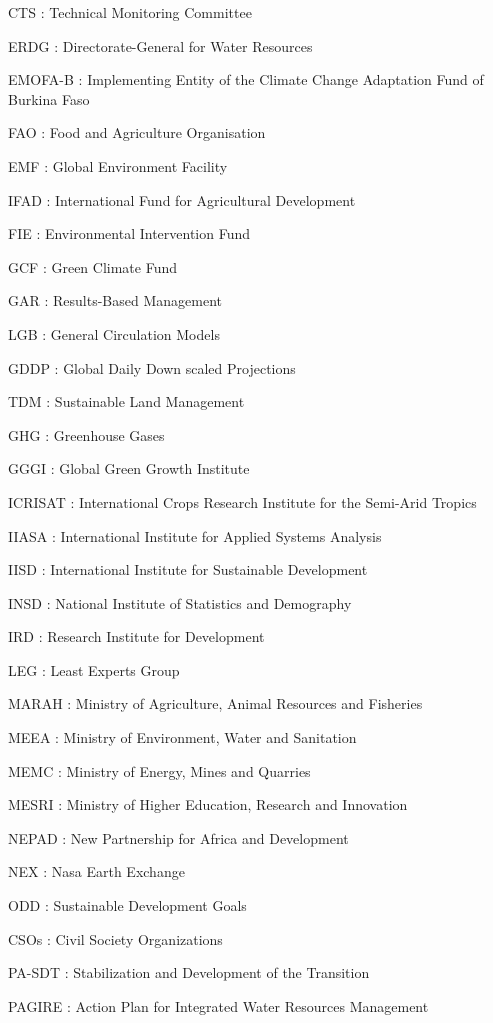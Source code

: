 \documentclass[
]{book}
\begin{document}
CTS : Technical Monitoring Committee

ERDG : Directorate-General for Water Resources

EMOFA-B : Implementing Entity of the Climate Change Adaptation Fund of Burkina Faso

FAO : Food and Agriculture Organisation

EMF : Global Environment Facility

IFAD : International Fund for Agricultural Development

FIE : Environmental Intervention Fund

GCF : Green Climate Fund

GAR : Results-Based Management

LGB : General Circulation Models

GDDP : Global Daily Down scaled Projections

TDM : Sustainable Land Management

GHG : Greenhouse Gases

GGGI : Global Green Growth Institute

ICRISAT : International Crops Research Institute for the Semi-Arid Tropics

IIASA : International Institute for Applied Systems Analysis

IISD : International Institute for Sustainable Development

INSD : National Institute of Statistics and Demography

IRD : Research Institute for Development

LEG : Least Experts Group

MARAH : Ministry of Agriculture, Animal Resources and Fisheries

MEEA : Ministry of Environment, Water and Sanitation

MEMC : Ministry of Energy, Mines and Quarries

MESRI : Ministry of Higher Education, Research and Innovation

NEPAD : New Partnership for Africa and Development

NEX : Nasa Earth Exchange

ODD : Sustainable Development Goals

CSOs : Civil Society Organizations

PA-SDT : Stabilization and Development of the Transition

PAGIRE : Action Plan for Integrated Water Resources Management
\end{document}
